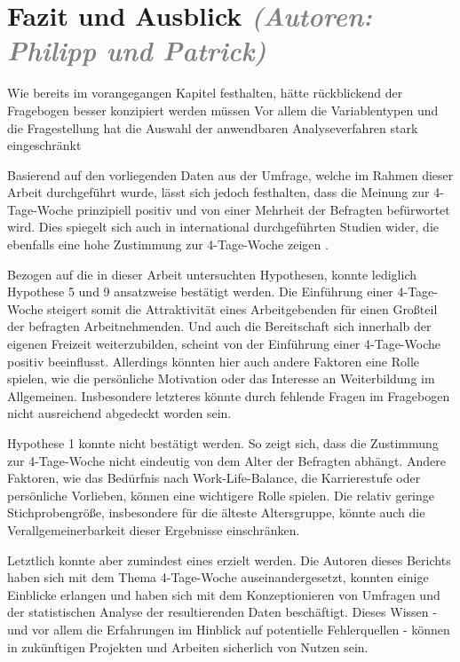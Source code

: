 \chapter{Fazit und Ausblick \textit{\textcolor{gray}{(Autoren: Philipp und Patrick)}}}

Wie bereits im vorangegangen Kapitel festhalten, hätte rückblickend der Fragebogen besser konzipiert werden müssen
Vor allem die Variablentypen und die Fragestellung hat die Auswahl der anwendbaren Analyseverfahren stark eingeschränkt

Basierend auf den vorliegenden Daten aus der Umfrage, welche im Rahmen dieser Arbeit durchgeführt wurde, 
lässt sich jedoch festhalten, dass die Meinung zur 4-Tage-Woche prinzipiell positiv und von einer Mehrheit
der Befragten befürwortet wird. Dies spiegelt sich auch in international durchgeführten Studien wider,
die ebenfalls eine hohe Zustimmung zur 4-Tage-Woche zeigen \parencite[vgl.][]{4_day_week_limited_4_2023}.

Bezogen auf die in dieser Arbeit untersuchten Hypothesen, konnte lediglich Hypothese 5 und 9 ansatzweise bestätigt werden.
Die Einführung einer 4-Tage-Woche steigert somit die Attraktivität eines Arbeitgebenden für einen Großteil der befragten 
Arbeitnehmenden.
Und auch die Bereitschaft sich innerhalb der eigenen Freizeit weiterzubilden, scheint von der Einführung
einer 4-Tage-Woche positiv beeinflusst. Allerdings könnten hier auch andere Faktoren eine Rolle spielen, wie die 
persönliche Motivation oder das Interesse an Weiterbildung im Allgemeinen. Insbesondere letzteres könnte durch fehlende 
Fragen im Fragebogen nicht ausreichend abgedeckt worden sein.

Hypothese 1 konnte nicht bestätigt werden. So zeigt sich, dass die Zustimmung zur 4-Tage-Woche nicht eindeutig 
von dem Alter der Befragten abhängt. Andere Faktoren, wie das Bedürfnis nach Work-Life-Balance, die Karrierestufe oder 
persönliche Vorlieben, können eine wichtigere Rolle spielen. Die relativ geringe Stichprobengröße, insbesondere für 
die älteste Altersgruppe, könnte auch die Verallgemeinerbarkeit dieser Ergebnisse einschränken.

Letztlich konnte aber zumindest eines erzielt werden. Die Autoren dieses Berichts haben sich mit dem Thema 4-Tage-Woche
auseinandergesetzt, konnten einige Einblicke erlangen und haben sich mit dem Konzeptionieren von Umfragen und der 
statistischen Analyse der resultierenden Daten beschäftigt. Dieses Wissen - und vor allem die Erfahrungen im Hinblick auf
potentielle Fehlerquellen - können in zukünftigen Projekten und Arbeiten sicherlich von Nutzen sein.